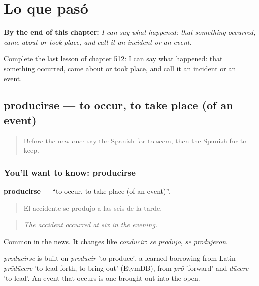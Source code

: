 
\chapter{Lo que pasó}
\label{ch:es-lo-que-paso}

\begin{chapteropening}
\textbf{By the end of this chapter:} \emph{I can say what happened: that something occurred, came about or took place, and call it an incident or an event.}

Complete the last lesson of chapter 512: I can say what happened: that something occurred, came about or took place, and call it an incident or an event.
\end{chapteropening}

\section[producirse]{producirse — to occur, to take place (of an event)}

\label{lesson:ES-C512-producirse}



\begin{quote}
Before the new one: say the Spanish for to seem, then the Spanish for to keep.
\end{quote}

\subsection*{You'll want to know: producirse}
\textbf{producirse} — \textquotedblleft{}to occur, to take place (of an event)\textquotedblright{}.

\begin{quote}
El accidente se produjo a las seis de la tarde.
\end{quote}

\begin{quote}
\emph{The accident occurred at six in the evening.}
\end{quote}

Common in the news. It changes like \emph{conducir}: \emph{se produjo}, \emph{se produjeron}.

\begin{cousinweb}
\emph{producirse} is built on \emph{producir} 'to produce', a learned borrowing from Latin \emph{prōdūcere} 'to lead forth, to bring out' (EtymDB), from \emph{prō} 'forward' and \emph{dūcere} 'to lead'. An event that occurs is one brought out into the open.
\end{cousinweb}

